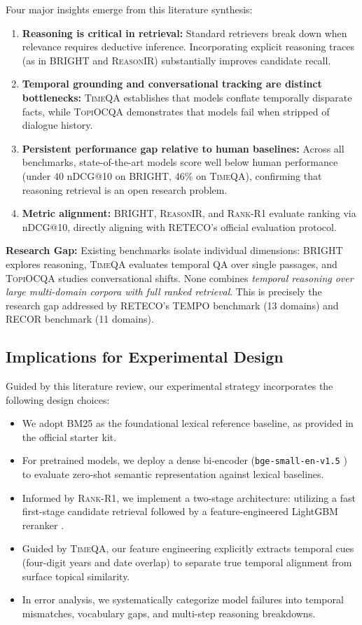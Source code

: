 Four major insights emerge from this literature synthesis:
\begin{enumerate}
    \item \textbf{Reasoning is critical in retrieval:} Standard retrievers break down when relevance requires deductive inference. Incorporating explicit reasoning traces (as in \textsc{BRIGHT} and \textsc{ReasonIR}) substantially improves candidate recall.
    \item \textbf{Temporal grounding and conversational tracking are distinct bottlenecks:} \textsc{TimeQA} establishes that models conflate temporally disparate facts, while \textsc{TopiOCQA} demonstrates that models fail when stripped of dialogue history.
    \item \textbf{Persistent performance gap relative to human baselines:} Across all benchmarks, state-of-the-art models score well below human performance (under 40 nDCG@10 on \textsc{BRIGHT}, 46\% on \textsc{TimeQA}), confirming that reasoning retrieval is an open research problem.
    \item \textbf{Metric alignment:} \textsc{BRIGHT}, \textsc{ReasonIR}, and \textsc{Rank-R1} evaluate ranking via nDCG@10, directly aligning with RETECO's official evaluation protocol.
\end{enumerate}

\textbf{Research Gap:} Existing benchmarks isolate individual dimensions: \textsc{BRIGHT} explores reasoning, \textsc{TimeQA} evaluates temporal QA over single passages, and \textsc{TopiOCQA} studies conversational shifts. None combines \textit{temporal reasoning over large multi-domain corpora with full ranked retrieval}. This is precisely the research gap addressed by RETECO's TEMPO benchmark \cite{tempo} (13 domains) and RECOR benchmark \cite{recor} (11 domains).

\subsection{Implications for Experimental Design}
Guided by this literature review, our experimental strategy incorporates the following design choices:
\begin{itemize}
    \item We adopt BM25 \cite{bm25} as the foundational lexical reference baseline, as provided in the official starter kit.
    \item For pretrained models, we deploy a dense bi-encoder (\texttt{bge-small-en-v1.5} \cite{bge_models}) to evaluate zero-shot semantic representation against lexical baselines.
    \item Informed by \textsc{Rank-R1}, we implement a two-stage architecture: utilizing a fast first-stage candidate retrieval followed by a feature-engineered LightGBM reranker \cite{lightgbm}.
    \item Guided by \textsc{TimeQA}, our feature engineering explicitly extracts temporal cues (four-digit years and date overlap) to separate true temporal alignment from surface topical similarity.
    \item In error analysis, we systematically categorize model failures into temporal mismatches, vocabulary gaps, and multi-step reasoning breakdowns.
\end{itemize}

